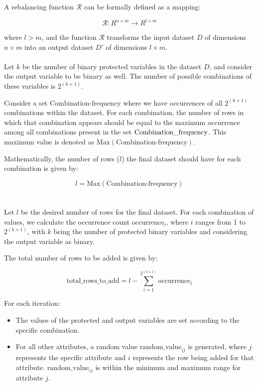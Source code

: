 \documentclass[12pt,a4paper,openright,twoside]{book}
\begin{document}
A rebalancing function \( \mathcal{R} \) can be formally defined as a mapping:

\[
\mathcal{R}: R^{n \times m} \rightarrow R^{l \times m}
\]

where \( l > m \), and the function \( \mathcal{R} \) transforms the input dataset \( D \) of dimensions \( n \times m \) into an output dataset \( D' \) of dimensions \( l \times m \).\\
\\
Let \( k \) be the number of binary protected variables in the dataset \( D \), and consider the output variable to be binary as well. The number of possible combinations of these variables is \( 2^{(k+1)} \).

Consider a set \( \text{Combination-frequency} \) where we have occurrences of all \( 2^{(k+1)} \) combinations within the dataset. For each combination, the number of rows in which that combination appears should be equal to the maximum occurrence among all combinations present in the set \( \text{Combination\textunderscore frequency} \). This maximum value is denoted as \( \text{Max}(\text{Combination-frequency}) \).

Mathematically, the number of rows (\( l \)) the final dataset should have for each combination is given by:

\[
l = \text{Max}(\text{Combination-frequency})
\]\\
\\
Let \( l \) be the desired number of rows for the final dataset. For each combination of values, we calculate the occurrence count \( \text{occurrence}_i \), where \( i \) ranges from 1 to \( 2^{(k+1)} \), with \( k \) being the number of protected binary variables and considering the output variable as binary.

The total number of rows to be added is given by:

\[
\text{total\_rows\_to\_add} = l - \sum_{i=1}^{2^{(k+1)}} \text{occurrence}_i
\]

For each iteration:
\begin{itemize}
    \item The values of the protected and output variables are set according to the specific combination.
    \item For all other attributes, a random value \( \text{random\_value}_{ij} \) is generated, where \( j \) represents the specific attribute and \( i \) represents the row being added for that attribute. \( \text{random\_value}_{ij} \) is within the minimum and maximum range for attribute \( j \).
\end{itemize}
\end{document}

